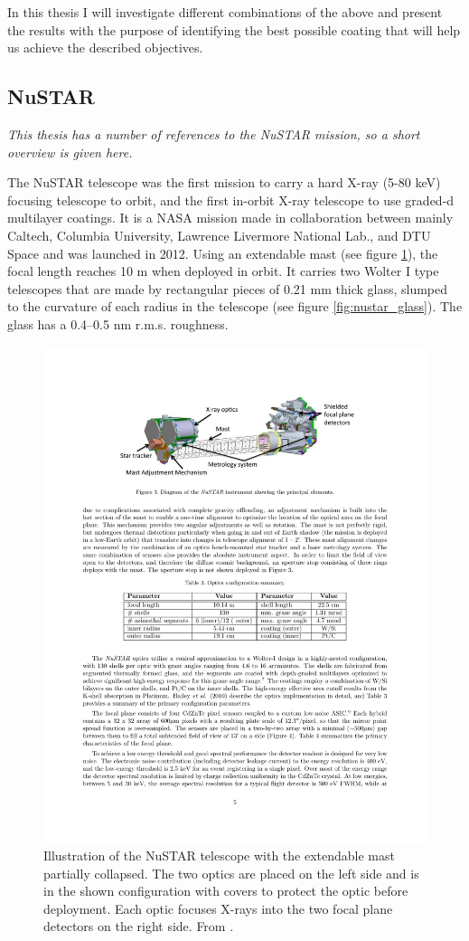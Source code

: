 In this thesis I will investigate different combinations of the above and present the results with the purpose of identifying the best possible coating that will help us achieve the described objectives.

\subsection{NuSTAR}\label{sec:nustar}
\emph{This thesis has a number of references to the NuSTAR mission, so a short overview is given here.}

The NuSTAR telescope was the first mission to carry a hard X-ray (5-80 keV) focusing telescope to orbit, and the first in-orbit X-ray telescope to use graded-d multilayer coatings. It is a NASA mission made in collaboration between mainly Caltech, Columbia University, Lawrence Livermore National Lab., and DTU Space and was launched in 2012. Using an extendable mast (see figure \ref{fig:nustar}), the focal length reaches 10 m when deployed in orbit. It carries two Wolter I type telescopes that are made by rectangular pieces of 0.21 mm thick glass, slumped to the curvature of each radius in the telescope\cite{Craig:2000fd,Hailey:1997ie} (see figure \ref{fig:nustar_glass}). The glass has a 0.4--0.5 nm r.m.s. roughness.

\begin{figure}[!htp] %
	\centering	\includegraphics[width=0.8\linewidth]{figures/introduction/nustar.pdf}
	\caption{\footnotesize Illustration of the NuSTAR telescope with the extendable mast partially collapsed. The two optics are placed on the left side and is in the shown configuration with covers to protect the optic before deployment. Each optic focuses X-rays into the two focal plane detectors on the right side. From \cite{Harrison:2010gu}.}
	\label{fig:nustar}
\end{figure}

